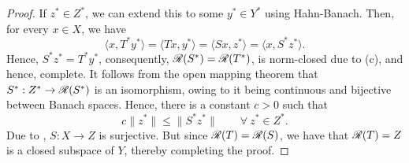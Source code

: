 \begin{proof}
    If $z^\ast\in Z^\ast$, we can extend this to some $y^\ast\in Y^\ast$ using Hahn-Banach. Then, for every $x\in X$, we have 
    \begin{equation*}
        \langle x, T^\ast y^\ast\rangle = \langle Tx, y^\ast\rangle = \langle Sx, z^\ast\rangle = \langle x, S^\ast z^\ast\rangle.
    \end{equation*}
    Hence, $S^\ast z^\ast = T^\ast y^\ast$, consequently, $\mathscr R(S^\ast) = \mathscr R(T^\ast)$, is norm-closed due to (c), and hence, complete. It follows from the open mapping theorem that $S^\ast: Z^\ast\to\mathscr R(S^\ast)$ is an isomorphism, owing to it being continuous and bijective between Banach spaces. Hence, there is a constant $c > 0$ such that 
    \begin{equation*}
        c\|z^\ast\|\le\|S^\ast z^\ast\|\qquad\forall~z^\ast\in Z^\ast.
    \end{equation*}
    Due to , $S: X\to Z$ is surjective. But since $\mathscr R(T) = \mathscr R(S)$, we have that $\mathscr R(T) = Z$ is a closed subspace of $Y$, thereby completing the proof.
\end{proof}